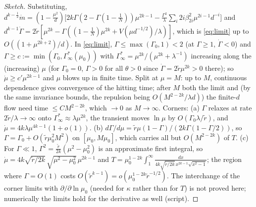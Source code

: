 \begin{proof}[Sketch]
Substituting, $d^{k-\frac12}\dot m=(1-\frac{\mu^2}d)\big[2k\Gamma(2-\Gamma(1-\frac1N))\mu^{2k-1}-\frac{\Gamma^2}\lambda\sum_i2i\beta_{2i}^2\mu^{2i-1}d^{-i}\big]$ and
$d^{k-1}\dot\Gamma=2\tilde r[\mu^{2k}-\Gamma((1-\frac1N)\mu^{2k}+V(\mu d^{-1/2})/\lambda)]$, which is \eqref{eq:limit} up to $O((1+\mu^{2k+2})/d)$.
In \eqref{eq:limit}, $\Gamma\le\max(\Gamma_0,1)<2$ (at $\Gamma\ge1$, $\dot\Gamma<0$) and $\Gamma\ge c:=\min(\Gamma_0,\Gamma^*_\infty(\mu_0))$ with
$\Gamma^*_\infty=\mu^{2k}/(\mu^{2k}+\lambda^{-1})$ increasing along the (increasing) $\mu$ (for $\Gamma_0=0$, $\Gamma>0$ for all $\theta>0$ since $\dot\Gamma=2\tilde r\mu^{2k}>0$ there); so $\dot\mu\ge c'\mu^{2k-1}$ and $\mu$ blows up in finite time. Split at
$\mu=M$: up to $M$, continuous dependence gives convergence of the hitting time; after $M$ both the limit and (by the same invariance bounds, the repulsion
being $O(M^{2-2k}/\lambda d)$) the finite-$d$ flow need time $\le C M^{2-2k}$, which $\to0$ as $M\to\infty$. Corners: (a) $\Gamma$ relaxes at rate
$2\tilde r/\lambda\to\infty$ onto $\Gamma^*_\infty\approx\lambda\mu^{2k}$, the transient moves $\ln\mu$ by $O(\Gamma_0\lambda/\tilde r)$, and
$\dot\mu=4k\lambda\mu^{4k-1}(1+o(1))$. (b) $d\Gamma/d\mu=\tilde r\mu(1-\Gamma)/(2k\Gamma(1-\Gamma/2))$, so $\Gamma=\Gamma_0+O(\tilde r\mu_0^2M^2)$ on
$[\mu_0,M\mu_0]$, which carries all but $O(M^{2-2k})$ of $T$. (c) For $\Gamma\ll1$, $\Gamma^2=\frac{\tilde r}{2k}(\mu^2-\mu_0^2)$ is an approximate first
integral, so $\dot\mu=4k\sqrt{\tilde r/2k}\,\sqrt{\mu^2-\mu_0^2}\,\mu^{2k-1}$ and $T=\mu_0^{1-2k}\int_1^\infty\!\frac{dx}{4k\sqrt{\tilde r/2k}\,x^{2k-1}\sqrt{x^2-1}}$;
the region where $\Gamma=O(1)$ costs $O(\tilde r^{k-1})=o(\mu_0^{1-2k}\tilde r^{-1/2})$. The interchange of the corner limits with $\partial/\partial\ln\mu_0$
(needed for $\kappa$ rather than for $T$) is not proved here; numerically the limits hold for the derivative as well (script).
\end{proof}

